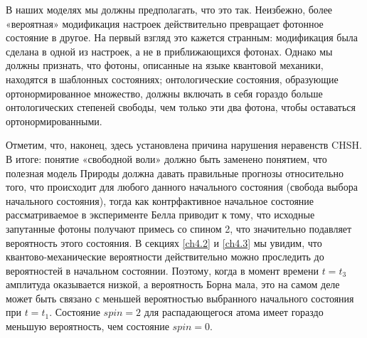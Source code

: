 \documentclass[main.tex]{subfiles}
\begin{document}
В наших моделях мы должны предполагать, что это так. Неизбежно, более «вероятная» модификация настроек действительно превращает фотонное состояние в другое. На первый взгляд это кажется странным: модификация была сделана в одной из настроек, а не в приближающихся фотонах. Однако мы должны признать, что фотоны, описанные на языке квантовой механики, находятся в шаблонных состояниях; онтологические состояния, образующие ортонормированное множество, должны включать в себя гораздо больше онтологических степеней свободы, чем только эти два фотона, чтобы оставаться ортонормированными.

Отметим, что, наконец, здесь установлена причина нарушения неравенств CHSH. В итоге: понятие «свободной воли» должно быть заменено понятием, что полезная модель Природы должна давать правильные прогнозы относительно того, что происходит для любого данного начального состояния (свобода выбора начального состояния), тогда как контрфактивное начальное состояние рассматриваемое в эксперименте Белла приводит к тому, что исходные запутанные фотоны получают примесь со спином 2, что значительно подавляет вероятность этого состояния.
В секциях \ref{ch4.2} и \ref{ch4.3} мы увидим, что квантово-механические вероятности действительно можно проследить до вероятностей в начальном состоянии. Поэтому, когда в момент времени $t = t_3$ амплитуда оказывается низкой, а вероятность Борна мала, это на самом деле может быть связано с меньшей вероятностью выбранного начального состояния при $t = t_1$. Состояние $spin = 2$ для распадающегося атома имеет гораздо меньшую вероятность, чем состояние $spin = 0$.
\end{document}
